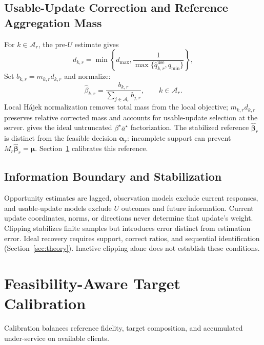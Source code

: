 \documentclass[letterpaper,journal]{IEEEtran}
\begin{document}
\subsection{Usable-Update Correction and Reference Aggregation Mass}
\label{subsec:usable_correction}

For $k\in\mathcal A_r$, the pre-$U$ estimate gives
\begin{equation}
 d_{k,r}
 =
 \min\!\left\{
 d_{\max},
 \frac{1}
 {\max\{\widehat q^{\mathrm{use}}_{k,r},q_{\min}\}}
 \right\},
 \label{eq:d_use}
\end{equation}
Set $b_{k,r}=m_{k,r}d_{k,r}$ and normalize:
\begin{equation}
 \widehat\beta_{k,r}
 =
 \frac{b_{k,r}}
 {\sum_{j\in\mathcal{A}_r}b_{j,r}},
 \qquad
 k\in\mathcal{A}_r.
 \label{eq:beta_ref}
\end{equation}
Local H\'ajek normalization removes total mass from the local objective;
$m_{k,r}d_{k,r}$ preserves relative corrected mass and accounts for
usable-update selection at the server.
 gives the ideal untruncated
$\beta^\star\overline a^\star$ factorization. The stabilized reference
$\widehat{\boldsymbol\beta}_r$ is distinct from the feasible decision
$\boldsymbol\alpha_r$: incomplete support can prevent
$M_r\widehat{\boldsymbol\beta}_r=\boldsymbol\mu$.
Section~\ref{sec:calibration} calibrates this reference.

\subsection{Information Boundary and Stabilization}
\label{subsec:information_boundary}

Opportunity estimates are lagged, observation models exclude current responses,
and usable-update models exclude $U$ outcomes and future information.  Current
update coordinates, norms, or directions never determine that update's weight.
Clipping stabilizes finite samples but introduces error distinct from
estimation error.  Ideal recovery requires support, correct ratios, and
sequential identification (Section~\ref{sec:theory}).  Inactive clipping alone
does not establish these conditions.

\section{Feasibility-Aware Target Calibration}
\label{sec:calibration}

Calibration balances reference fidelity, target composition, and accumulated
under-service on available clients.
\end{document}
